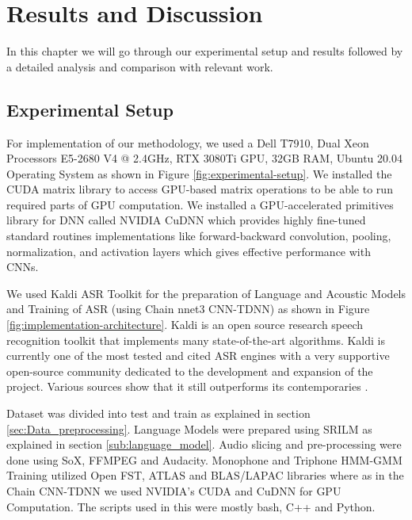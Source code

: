 \chapter{Results and Discussion} %
\label{cha:results}
In this chapter we will go through our experimental setup and results followed by a detailed analysis and comparison with relevant work.

\section{Experimental Setup} %
\label{sec:Implementation}

For implementation of our methodology, we used a Dell T7910, Dual Xeon Processors E5-2680 V4 @ 2.4GHz, RTX 3080Ti GPU, 32GB RAM, Ubuntu 20.04 Operating System as shown in Figure \ref{fig:experimental-setup}. We installed the CUDA matrix library to access GPU-based matrix operations to be able to run required parts of GPU computation. We installed a GPU-accelerated primitives library for DNN called NVIDIA CuDNN which provides highly fine-tuned standard routines implementations like forward-backward convolution, pooling, normalization, and activation layers which gives effective performance with CNNs.

We used Kaldi ASR \cite{daniel_povey_kaldi_nodate} Toolkit for the preparation of Language and Acoustic Models and Training of ASR (using Chain nnet3 CNN-TDNN) as shown in Figure \ref{fig:implementation-architecture}. Kaldi is an open source research speech recognition toolkit that implements many state-of-the-art algorithms. Kaldi is currently one of the most tested and cited ASR engines with a very supportive open-source community dedicated to the development and expansion of the project. Various sources show that it still outperforms its contemporaries \cite{christian_gaida_comparing_2014} \cite{georgescu_performance_2021}.

Dataset was divided into test and train as explained in section \ref{sec:Data_preprocessing}. Language Models were prepared using SRILM as explained in section \ref{sub:language_model}. Audio slicing and pre-processing were done using SoX, FFMPEG and Audacity. Monophone and Triphone HMM-GMM Training utilized Open FST, ATLAS and BLAS/LAPAC libraries where as in the Chain CNN-TDNN we used NVIDIA's CUDA and CuDNN for GPU Computation. The scripts used in this were mostly bash, C++ and Python. 


